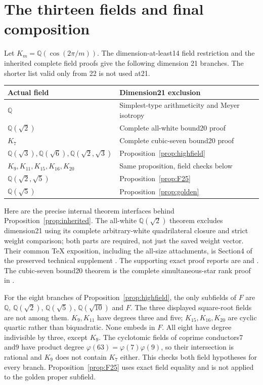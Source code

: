 \documentclass[11pt]{article}
\newcommand{\Q}{\mathbb Q}
\begin{document}
\section{The thirteen fields and final composition}\label{sec:fields}
Let $K_m=\Q(\cos(2\pi/m))$. The dimension-at-least14 field restriction
\cite{Vinberg,Nikulin}
and the inherited complete field proofs give the following dimension 21
branches. The shorter list valid only from 22 is not used at21.
\begin{center}
\begin{tabular}{ll}\toprule
Actual field&Dimension21 exclusion\\\midrule
$\Q$&Simplest-type arithmeticity and Meyer isotropy\\
$\Q(\sqrt2)$&Complete all-white bound20 proof\\
$K_7$&Complete cubic-seven bound20 proof\\
$\Q(\sqrt3),\Q(\sqrt6),\Q(\sqrt2,\sqrt3)$&Proposition~\ref{prop:highfield}\\
$K_9,K_{11},K_{15},K_{16},K_{20}$&Same proposition, field checks below\\
$\Q(\sqrt2,\sqrt5)$&Proposition~\ref{prop:F25}\\
$\Q(\sqrt5)$&Proposition~\ref{prop:golden}\\\bottomrule
\end{tabular}
\end{center}
Here are the precise internal theorem interfaces behind
Proposition~\ref{prop:inherited}. The all-white $\Q(\sqrt2)$ theorem
excludes dimension21 using its complete arbitrary-white quadrilateral
closure and strict weight comparison; both parts are required, not
just the saved weight vector. Their common TeX exposition, including
the all-size attachments, is Section4 of the preserved technical
supplement . The supporting
exact proof reports are
 and
.
The cubic-seven bound20 theorem is the complete simultaneous-star rank
proof in .

For the eight branches of Proposition~\ref{prop:highfield}, the only
subfields of $F$ are $\Q$, $\Q(\sqrt2)$, $\Q(\sqrt5)$,
$\Q(\sqrt{10})$ and $F$.
The three displayed square-root fields are not among them.
$K_9,K_{11}$ have degrees three and five; $K_{15},K_{16},K_{20}$
are cyclic quartic rather than biquadratic. None embeds in $F$.
All eight have degree indivisible by three, except $K_9$.
The cyclotomic fields of coprime conductors7 and9 have product
degree $\varphi(63)=\varphi(7)\varphi(9)$, so their intersection
is rational and $K_9$ does not contain $K_7$ either. This checks
both field hypotheses for every branch. Proposition~\ref{prop:F25}
uses exact field equality and is not applied to the golden proper subfield.
\end{document}
